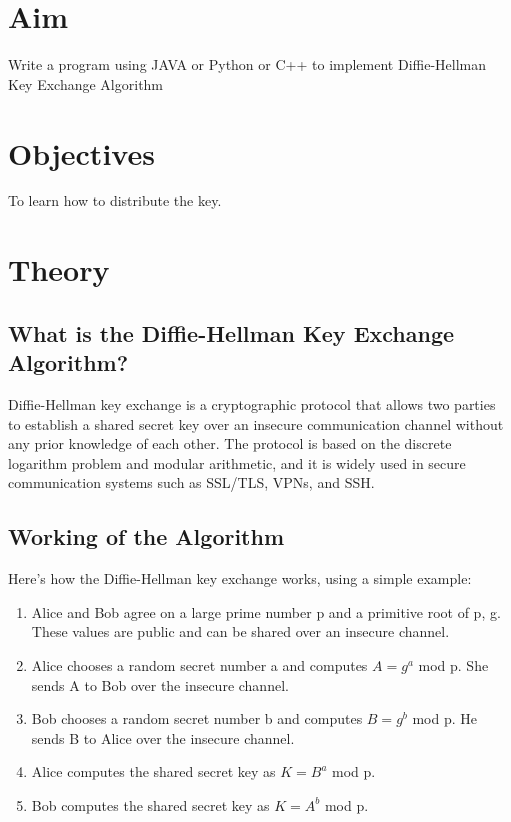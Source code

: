 \documentclass[11pt]{article}
\begin{document}
\tableofcontents
\thispagestyle{empty}
\clearpage

\setcounter{page}{1}

\section{Aim}
Write a program using JAVA or Python or C++ to implement Diffie-Hellman Key Exchange Algorithm

\section{Objectives}
To learn how to distribute the key.

\section{Theory}

\subsection{What is the Diffie-Hellman Key Exchange Algorithm?}

Diffie-Hellman key exchange is a cryptographic protocol that allows two parties to establish a shared secret key over an insecure communication channel without any prior knowledge of each other. The protocol is based on the discrete logarithm problem and modular arithmetic, and it is widely used in secure communication systems such as SSL/TLS, VPNs, and SSH.

\subsection{Working of the Algorithm}

Here's how the Diffie-Hellman key exchange works, using a simple example:

\begin{enumerate}
    \item Alice and Bob agree on a large prime number p and a primitive root of p, g. These values are public and can be shared over an insecure channel.
    \item Alice chooses a random secret number a and computes $ A = g^a $ mod p. She sends A to Bob over the insecure channel.
    \item Bob chooses a random secret number b and computes $B = g^b$ mod p. He sends B to Alice over the insecure channel.
    \item Alice computes the shared secret key as $K = B^a$ mod p.
    \item Bob computes the shared secret key as $K = A^b$ mod p.
\end{enumerate}
\end{document}
